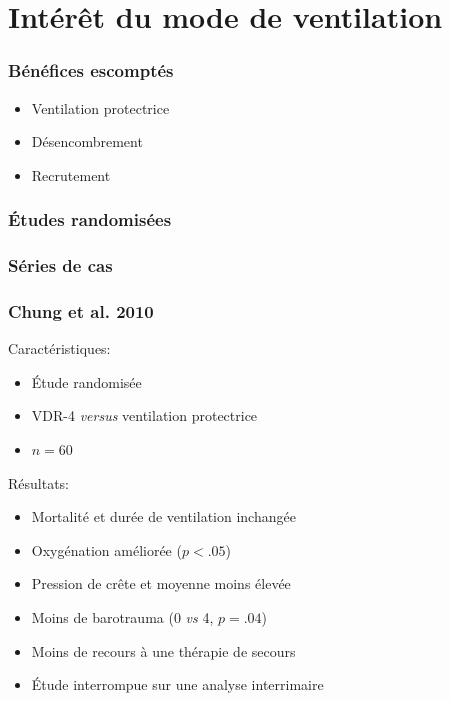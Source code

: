 \documentclass[aspectratio=169]{beamer}
\begin{document}
\section{Intérêt du mode de ventilation}

\begin{frame}
	\frametitle{Bénéfices escomptés}

	\begin{itemize}
		\item Ventilation protectrice
		\item Désencombrement
		\item Recrutement
	\end{itemize}

\end{frame}

\begin{frame}
	\frametitle{Études randomisées}
	
\end{frame}

\begin{frame}
	\frametitle{Séries de cas}
	
\end{frame}

\begin{frame}
	\frametitle{Chung et al. 2010}

	\begin{block}{Caractéristiques:}

	\begin{itemize}
		\item Étude randomisée
		\item VDR-4 \textit{versus} ventilation protectrice
		\item $n=60$
	\end{itemize}
	\end{block}

	\begin{block}{Résultats:}

	\begin{itemize}
		\item Mortalité et durée de ventilation inchangée
		\item Oxygénation améliorée ($p < .05$)
		\item Pression de crête et moyenne moins élevée
		\item Moins de barotrauma (0 \textit{vs} 4, $p=.04$)
		\item Moins de recours à une thérapie de secours
		\item Étude interrompue sur une analyse interrimaire
	\end{itemize}
	\end{block}

\end{frame}
\end{document}
